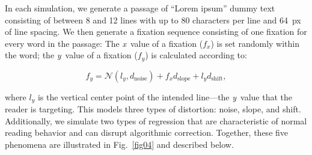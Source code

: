 \documentclass[doc,biblatex]{apa7}
\begin{document}
In each simulation, we generate a passage of ``Lorem ipsum'' dummy text consisting of between 8 and 12 lines with up to 80 characters per line and 64~px of line spacing. We then generate a fixation sequence consisting of one fixation for every word in the passage: The \textit{x}~value of a fixation ($f_x$) is set randomly within the word; the \textit{y}~value of a fixation ($f_y$) is calculated according to:

	\begin{equation}
	f_y = \mathcal{N}(l_y, d_\mathrm{noise}) + f_x d_\mathrm{slope} + l_y d_\mathrm{shift},
	\label{equation1}
	\end{equation}

\noindent where $l_y$ is the vertical center point of the intended line---the \textit{y}~value that the reader is targeting. This models three types of distortion: noise, slope, and shift. Additionally, we simulate two types of regression that are characteristic of normal reading behavior and can disrupt algorithmic correction. Together, these five phenomena are illustrated in Fig.~\ref{fig04} and described below.
\end{document}
